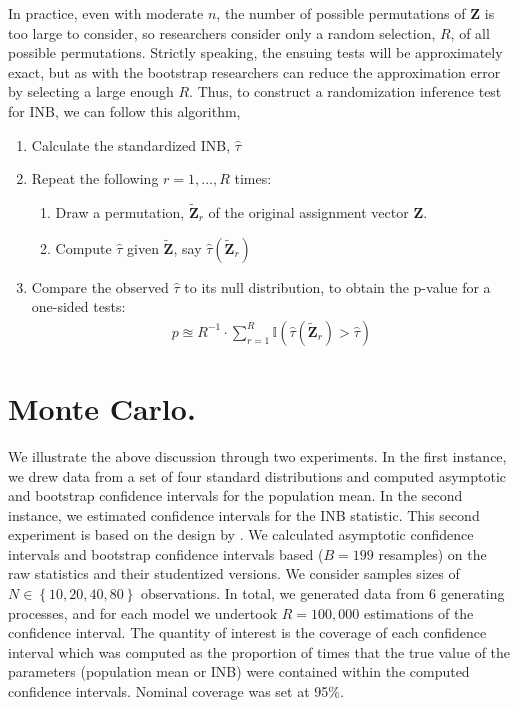 \documentclass[english, 11pt,a4paper, ]{article}
\begin{document}
 In practice, even with moderate $n$, the number of possible permutations of $\mathbf{Z}$ is too large to consider, so researchers consider only a random selection, $R$, of all possible permutations. Strictly speaking, the ensuing tests will be approximately exact, but as with the bootstrap researchers can reduce the approximation error by selecting a large enough  $R$. Thus, to construct a randomization inference test for INB, we can follow this algorithm,

 \begin{enumerate}
	\item Calculate the  standardized INB, $\hat{\tau}$
	\item Repeat the following $r=1,...,R$ times:
	\begin{enumerate}
		\item Draw a permutation, $\tilde{\mathbf{Z}}_r$ of the original assignment vector $\mathbf{Z}$.
		\item Compute $\hat{\tau}$ given $\tilde{\mathbf{Z}}$, say $\hat{\tau}(\tilde{\mathbf{Z}}_r)$
	\end{enumerate}
	\item Compare the observed $\hat{\tau}$ to its null distribution, to obtain the p-value for a one-sided tests: 
	\begin{align}
		p \approxeq R^{-1}\cdot \sum_{r=1}^R \mathbb{I}(\hat{\tau}(\tilde{\mathbf{Z}}_r)>\hat{\tau})
	\end{align}
 \end{enumerate}
 


\section{Monte Carlo.}

We illustrate the above discussion through two  experiments. In the first instance, we drew data from a set of four standard distributions and computed asymptotic and bootstrap  confidence intervals for the population mean.
In the second instance, we estimated confidence intervals for the  
INB statistic. This second experiment is based on the design by \cite{NixonWonderlingGrieve2010HealthEconomics}. We calculated asymptotic confidence intervals and bootstrap confidence intervals based ($ B=199 $ resamples) on the raw statistics and their studentized versions. We consider samples sizes of $ N\in \left\{10, 20, 40, 80\right\} $ observations.
In total, we generated data from 6 generating processes, and for each model we undertook $ R=100,000 $ estimations of the confidence interval.
The quantity of interest is the coverage of each confidence interval which was computed as the proportion of times that the true value of the parameters (population mean or INB) were contained
within the computed confidence intervals. Nominal coverage was set at 95\%.
\end{document}
